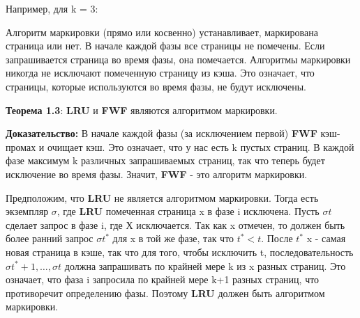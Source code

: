 Например, для k = 3:

\vspace{\baselineskip}


\vspace{\baselineskip}

Алгоритм маркировки (прямо или косвенно) устанавливает, маркирована страница или нет. В начале каждой фазы все страницы не помечены. Если запрашивается страница во время фазы, она помечается. Алгоритмы маркировки никогда не исключают помеченную страницу из кэша. Это означает, что страницы, которые используются во время фазы, не будут исключены.

\vspace{\baselineskip}

\textbf{Теорема 1.3}: \textbf{LRU} и \textbf{FWF} являются алгоритмом маркировки.

\vspace{\baselineskip}

\textbf{Доказательство:} В начале каждой фазы (за исключением первой) \textbf{FWF} кэш-промах и очищает кэш. Это означает, что у нас есть k пустых страниц. В каждой фазе максимум k различных запрашиваемых страниц, так что теперь будет исключение во время фазы. Значит, \textbf{FWF} - это алгоритм маркировки. 

\vspace{\baselineskip}

Предположим, что \textbf{LRU} не является алгоритмом маркировки. Тогда есть экземпляр $\sigma$, где \textbf{LRU} помеченная страница x в фазе i исключена. Пусть $\sigma t$ сделает запрос в фазе i, где Х исключается. Так как x отмечен, то должен быть более ранний запрос $\sigma t^*$ для x в той же фазе, так что $t^* < t$. После $t^*$ x - самая новая страница в кэше, так что для того, чтобы исключить t, последовательность $\sigma t^* + 1, \dots, \sigma t$ должна запрашивать по крайней мере k из x разных страниц. Это означает, что фаза i запросила по крайней мере k+1 разных страниц, что противоречит определению фазы. Поэтому \textbf{LRU} должен быть алгоритмом маркировки.